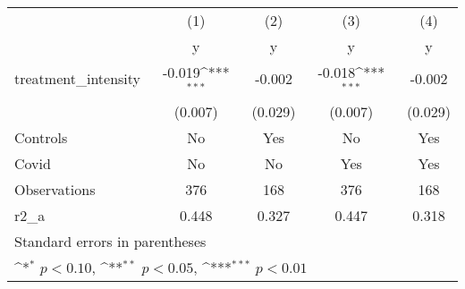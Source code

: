 {
\def\sym#1{\ifmmode^{#1}\else\(^{#1}\)\fi}
\begin{tabular}{l*{4}{c}}
\hline\hline
                    &\multicolumn{1}{c}{(1)}&\multicolumn{1}{c}{(2)}&\multicolumn{1}{c}{(3)}&\multicolumn{1}{c}{(4)}\\
                    &\multicolumn{1}{c}{y}&\multicolumn{1}{c}{y}&\multicolumn{1}{c}{y}&\multicolumn{1}{c}{y}\\
\hline
treatment\_intensity &      -0.019\sym{***}&      -0.002         &      -0.018\sym{***}&      -0.002         \\
                    &     (0.007)         &     (0.029)         &     (0.007)         &     (0.029)         \\
[1em]
Controls            &          No         &         Yes         &          No         &         Yes         \\
[1em]
Covid               &          No         &          No         &         Yes         &         Yes         \\
\hline
Observations        &         376         &         168         &         376         &         168         \\
r2\_a                &       0.448         &       0.327         &       0.447         &       0.318         \\
\hline\hline
\multicolumn{5}{l}{\footnotesize Standard errors in parentheses}\\
\multicolumn{5}{l}{\footnotesize \sym{*} \(p<0.10\), \sym{**} \(p<0.05\), \sym{***} \(p<0.01\)}\\
\end{tabular}
}

